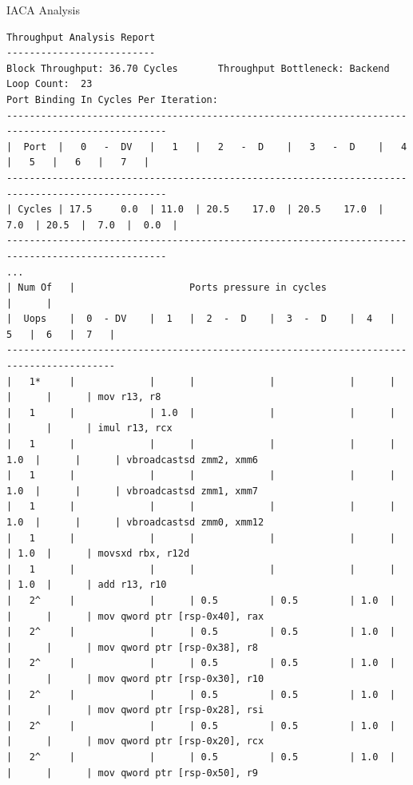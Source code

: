 \documentclass[aspectratio=169,t]{beamer}
\begin{document}
  \begin{frame}[fragile]{IACA Analysis}
    \vspace{-20pt}
    \begin{lstlisting}[basicstyle=\tt\fontsize{4pt}{6pt}\selectfont]
Throughput Analysis Report
--------------------------
Block Throughput: 36.70 Cycles       Throughput Bottleneck: Backend
Loop Count:  23
Port Binding In Cycles Per Iteration:
--------------------------------------------------------------------------------------------------
|  Port  |   0   -  DV   |   1   |   2   -  D    |   3   -  D    |   4   |   5   |   6   |   7   |
--------------------------------------------------------------------------------------------------
| Cycles | 17.5     0.0  | 11.0  | 20.5    17.0  | 20.5    17.0  |  7.0  | 20.5  |  7.0  |  0.0  |
--------------------------------------------------------------------------------------------------
...
| Num Of   |                    Ports pressure in cycles                         |      |
|  Uops    |  0  - DV    |  1   |  2  -  D    |  3  -  D    |  4   |  5   |  6   |  7   |
-----------------------------------------------------------------------------------------
|   1*     |             |      |             |             |      |      |      |      | mov r13, r8
|   1      |             | 1.0  |             |             |      |      |      |      | imul r13, rcx
|   1      |             |      |             |             |      | 1.0  |      |      | vbroadcastsd zmm2, xmm6
|   1      |             |      |             |             |      | 1.0  |      |      | vbroadcastsd zmm1, xmm7
|   1      |             |      |             |             |      | 1.0  |      |      | vbroadcastsd zmm0, xmm12
|   1      |             |      |             |             |      |      | 1.0  |      | movsxd rbx, r12d
|   1      |             |      |             |             |      |      | 1.0  |      | add r13, r10
|   2^     |             |      | 0.5         | 0.5         | 1.0  |      |      |      | mov qword ptr [rsp-0x40], rax
|   2^     |             |      | 0.5         | 0.5         | 1.0  |      |      |      | mov qword ptr [rsp-0x38], r8
|   2^     |             |      | 0.5         | 0.5         | 1.0  |      |      |      | mov qword ptr [rsp-0x30], r10
|   2^     |             |      | 0.5         | 0.5         | 1.0  |      |      |      | mov qword ptr [rsp-0x28], rsi
|   2^     |             |      | 0.5         | 0.5         | 1.0  |      |      |      | mov qword ptr [rsp-0x20], rcx
|   2^     |             |      | 0.5         | 0.5         | 1.0  |      |      |      | mov qword ptr [rsp-0x50], r9

\end{lstlisting}
\end{frame}
\end{document}
